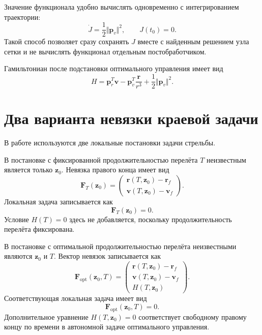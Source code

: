 Значение функционала удобно вычислять одновременно с интегрированием траектории:
\begin{equation}
	\dot J=\frac12\Vert\mathbf p_v\Vert^2,
	\qquad
	J(t_0)=0.
\end{equation}
Такой способ позволяет сразу сохранять \(J\) вместе с найденным решением узла сетки и не вычислять функционал отдельным постобработчиком.

Гамильтониан после подстановки оптимального управления имеет вид
\begin{equation}
	H
	=
	\mathbf p_r^T\mathbf v
	-
	\mathbf p_v^T\frac{\mathbf r}{r^3}
	+
	\frac12\Vert\mathbf p_v\Vert^2.
\end{equation}

\section*{Два варианта невязки краевой задачи}

В работе используются две локальные постановки задачи стрельбы.

В постановке с фиксированной продолжительностью перелёта \(T\) неизвестным является только \(\mathbf z_0\). Невязка правого конца имеет вид
\begin{equation}
	\mathbf F_T(\mathbf z_0)
	=
	\begin{pmatrix}
		\mathbf r(T,\mathbf z_0)-\mathbf r_f\\
		\mathbf v(T,\mathbf z_0)-\mathbf v_f
	\end{pmatrix}.
\end{equation}
Локальная задача записывается как
\begin{equation}
	\mathbf F_T(\mathbf z_0)=0.
\end{equation}
Условие \(H(T)=0\) здесь не добавляется, поскольку продолжительность перелёта фиксирована.

В постановке с оптимальной продолжительностью перелёта неизвестными являются \(\mathbf z_0\) и \(T\). Вектор невязок записывается как
\begin{equation}
	\mathbf F_{\mathrm{opt}}(\mathbf z_0,T)
	=
	\begin{pmatrix}
		\mathbf r(T,\mathbf z_0)-\mathbf r_f\\
		\mathbf v(T,\mathbf z_0)-\mathbf v_f\\
		H(T,\mathbf z_0)
	\end{pmatrix}.
\end{equation}
Соответствующая локальная задача имеет вид
\begin{equation}
	\mathbf F_{\mathrm{opt}}(\mathbf z_0,T)=0.
\end{equation}
Дополнительное уравнение \(H(T,\mathbf z_0)=0\) соответствует свободному правому концу по времени в автономной задаче оптимального управления.

